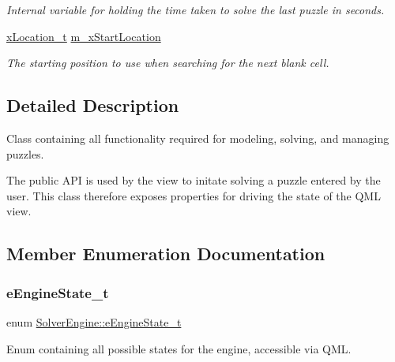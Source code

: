\begin{DoxyCompactItemize}
\begin{DoxyCompactList}\small\item\em Internal variable for holding the time taken to solve the last puzzle in seconds. \end{DoxyCompactList}\item 
\mbox{\hyperlink{struct_solver_engine_1_1x_location__t}{x\+Location\+\_\+t}} \mbox{\hyperlink{class_solver_engine_a82c02cac9a88788427e498ceb87e85d6}{m\+\_\+x\+Start\+Location}}
\begin{DoxyCompactList}\small\item\em The starting position to use when searching for the next blank cell. \end{DoxyCompactList}\end{DoxyCompactItemize}


\subsection{Detailed Description}
Class containing all functionality required for modeling, solving, and managing puzzles. 

The public A\+PI is used by the view to initate solving a puzzle entered by the user. This class therefore exposes properties for driving the state of the Q\+ML view. 

\subsection{Member Enumeration Documentation}
\mbox{\label{class_solver_engine_acd25f3521e492d4aa924f922396bf02c}} 
\subsubsection{\texorpdfstring{e\+Engine\+State\+\_\+t}{eEngineState\_t}}
{\footnotesize\ttfamily enum \mbox{\hyperlink{class_solver_engine_acd25f3521e492d4aa924f922396bf02c}{Solver\+Engine\+::e\+Engine\+State\+\_\+t}}}



Enum containing all possible states for the engine, accessible via Q\+ML. 

